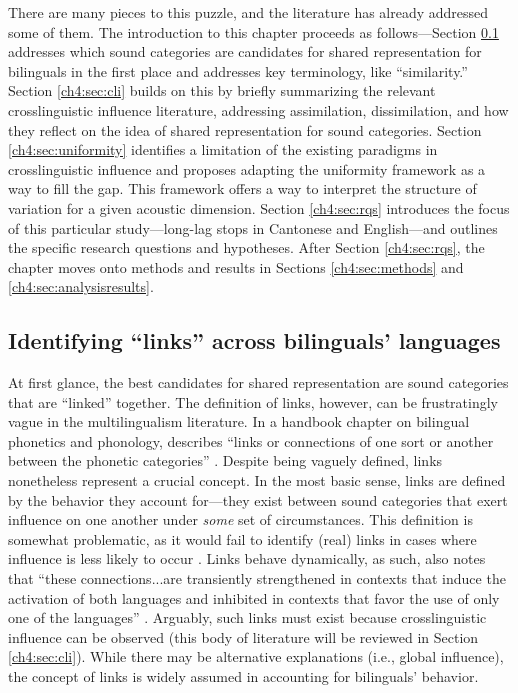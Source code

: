 There are many pieces to this puzzle, and the literature has already addressed some of them. The introduction to this chapter proceeds as follows---Section \ref{ch4:sec:links} addresses which sound categories are candidates for shared representation for bilinguals in the first place and addresses key terminology, like ``similarity.'' Section \ref{ch4:sec:cli} builds on this by briefly summarizing the relevant crosslinguistic influence literature, addressing assimilation, dissimilation, and how they reflect on the idea of shared representation for sound categories. Section \ref{ch4:sec:uniformity} identifies a limitation of the existing paradigms in crosslinguistic influence and proposes adapting the uniformity framework as a way to fill the gap. This framework offers a way to interpret the structure of variation for a given acoustic dimension. Section \ref{ch4:sec:rqs} introduces the focus of this particular study---long-lag stops in Cantonese and English---and outlines the specific research questions and hypotheses. After Section \ref{ch4:sec:rqs}, the chapter moves onto methods and results in Sections \ref{ch4:sec:methods} and \ref{ch4:sec:analysisresults}.

\subsection{Identifying ``links'' across bilinguals' languages}\label{ch4:sec:links}

At first glance, the best candidates for shared representation are sound categories that are ``linked'' together. The definition of links, however, can be frustratingly vague in the multilingualism literature. In a handbook chapter on bilingual phonetics and phonology, \citeauthor{simonet_2016_bilingualism} describes ``links or connections of one sort or another between the phonetic categories'' \citeyearpar[][p. 10]{simonet_2016_bilingualism}. Despite being vaguely defined, links nonetheless represent a crucial concept. In the most basic sense, links are defined by the behavior they account for---they exist between sound categories that exert influence on one another under \textit{some} set of circumstances. This definition is somewhat problematic, as it would fail to identify (real) links in cases where influence is less likely to occur \citep[cf.][]{grosjean_2011_transfer}. Links behave dynamically, as such,  \citeauthor{simonet_2016_bilingualism} also notes that ``these connections...are transiently strengthened in contexts that induce the activation of both languages and inhibited in contexts that favor the use of only one of the languages'' \citeyearpar[][p. 10]{simonet_2016_bilingualism}. Arguably, such links must exist because crosslinguistic influence can be observed (this body of literature will be reviewed in Section \ref{ch4:sec:cli}). While there may be alternative explanations (i.e., global influence), the concept of links is widely assumed in accounting for bilinguals' behavior. 

